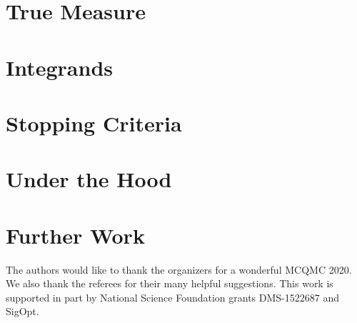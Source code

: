 \documentclass[graybox,footinfo]{svmult}
\begin{document}
\section{True Measure}

\section{Integrands}

\section{Stopping Criteria}

\section{Under the Hood}



\section{Further Work} \label{sec:further}


\begin{acknowledgement}
The authors would like to thank the organizers for a wonderful MCQMC 2020. 
We also thank the referees for their many helpful suggestions.  This work is supported in part by National Science Foundation grants DMS-1522687 and SigOpt.


\end{acknowledgement}



\end{document}
